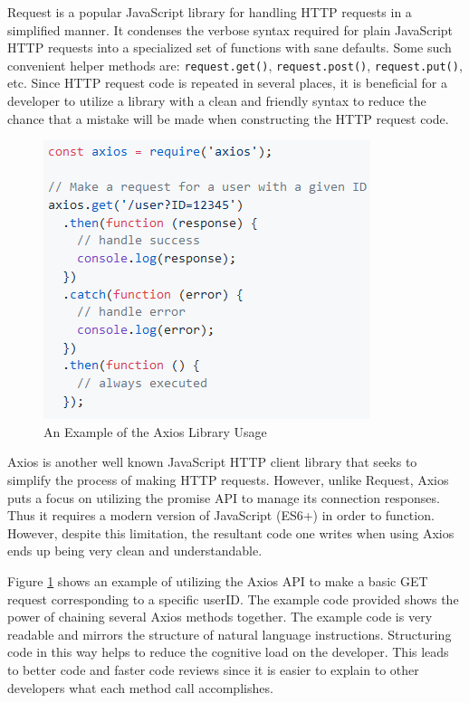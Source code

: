 \documentclass[12pt]{article}
\begin{document}
Request is a popular JavaScript library for handling HTTP requests in a simplified manner. It condenses the verbose syntax required for plain JavaScript HTTP requests into a specialized set of functions with sane defaults. Some such convenient helper methods are: \texttt{request.get()}, \texttt{request.post()}, \texttt{request.put()}, etc. Since HTTP request code is repeated in several places, it is beneficial for a developer to utilize a library with a clean and friendly syntax to reduce the chance that a mistake will be made when constructing the HTTP request code.

\begin{figure}[h]
	\centering
	\includegraphics[scale=0.7]{axios_example}
	\caption{An Example of the Axios Library Usage}
	\label{fig:axiosexample}
\end{figure}

Axios is another well known JavaScript HTTP client library that seeks to simplify the process of making HTTP requests. However, unlike Request, Axios puts a focus on utilizing the promise API to manage its connection responses. Thus it requires a modern version of JavaScript (ES6+) in order to function. However, despite this limitation, the resultant code one writes when using Axios ends up being very clean and understandable.

Figure \ref{fig:axiosexample} shows an example of utilizing the Axios API to make a basic GET request corresponding to a specific userID.\cite{axiosgithub} The example code provided shows the power of chaining several Axios methods together. The example code is very readable and mirrors the structure of natural language instructions. Structuring code in this way helps to reduce the cognitive load on the developer. This leads to better code and faster code reviews since it is easier to explain to other developers what each method call accomplishes.
\end{document}
